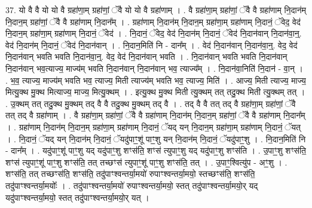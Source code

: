 \documentclass[17pt]{extarticle}
\begin{document}
37. यो वै वै यो यो वै ग्रहा॑णा॒म् ग्रहा॑णां॒ ॅवै यो यो वै ग्रहा॑णाम् । . वै ग्रहा॑णा॒म् ग्रहा॑णां॒ ॅवै वै ग्रहा॑णाम् नि॒दान॑म् नि॒दान॒म् ग्रहा॑णां॒ ॅवै वै ग्रहा॑णाम् नि॒दान᳚म् । . ग्रहा॑णाम् नि॒दान॑म् नि॒दान॒म् ग्रहा॑णा॒म् ग्रहा॑णाम् नि॒दानं॒ ॅवेद॒ वेद॑ नि॒दान॒म् ग्रहा॑णा॒म् ग्रहा॑णाम् नि॒दानं॒ ॅवेद॑ । . नि॒दानं॒ ॅवेद॒ वेद॑ नि॒दान॑म् नि॒दानं॒ ॅवेद॑ नि॒दान॑वान् नि॒दान॑वा॒न्॒. वेद॑ नि॒दान॑म् नि॒दानं॒ ॅवेद॑ नि॒दान॑वान् । . नि॒दान॒मिति॑ नि - दान᳚म् । . वेद॑ नि॒दान॑वान् नि॒दान॑वा॒न्॒. वेद॒ वेद॑ नि॒दान॑वान् भवति भवति नि॒दान॑वा॒न्॒. वेद॒ वेद॑ नि॒दान॑वान् भवति । . नि॒दान॑वान् भवति भवति नि॒दान॑वान् नि॒दान॑वान् भव॒त्याज्य॒ माज्य॑म् भवति नि॒दान॑वान् नि॒दान॑वान् भव॒ त्याज्य᳚म् । . नि॒दान॑वा॒निति॑ नि॒दान॑ - वा॒न् । . भ॒व॒ त्याज्य॒ माज्य॑म् भवति भव॒ त्याज्य॒ मिती त्याज्य॑म् भवति भव॒ त्याज्य॒ मिति॑ । . आज्य॒ मिती त्याज्य॒ माज्य॒ मित्यु॒क्थ मु॒क्थ मित्याज्य॒ माज्य॒ मित्यु॒क्थम् । . इत्यु॒क्थ मु॒क्थ मिती त्यु॒क्थम् तत् तदु॒क्थ मिती त्यु॒क्थम् तत् । . उ॒क्थम् तत् तदु॒क्थ मु॒क्थम् तद् वै वै तदु॒क्थ मु॒क्थम् तद् वै । . तद् वै वै तत् तद् वै ग्रहा॑णा॒म् ग्रहा॑णां॒ ॅवै तत् तद् वै ग्रहा॑णाम् । . वै ग्रहा॑णा॒म् ग्रहा॑णां॒ ॅवै वै ग्रहा॑णाम् नि॒दान॑म् नि॒दान॒म् ग्रहा॑णां॒ ॅवै वै ग्रहा॑णाम् नि॒दान᳚म् । . ग्रहा॑णाम् नि॒दान॑म् नि॒दान॒म् ग्रहा॑णा॒म् ग्रहा॑णाम् नि॒दानं॒ ॅयद् यन् नि॒दान॒म् ग्रहा॑णा॒म् ग्रहा॑णाम् नि॒दानं॒ ॅयत् । . नि॒दानं॒ ॅयद् यन् नि॒दान॑म् नि॒दानं॒ ॅयदु॑पाꣳ॒॒शू॑ पाꣳ॒॒शु यन् नि॒दान॑म् नि॒दानं॒ ॅयदु॑पाꣳ॒॒शु । . नि॒दान॒मिति॑ नि - दान᳚म् । . यदु॑पाꣳ॒॒शू॑ पाꣳ॒॒शु यद् यदु॑पाꣳ॒॒शु शꣳस॑ति॒ शꣳस॑ त्युपाꣳ॒॒शु यद् यदु॑पाꣳ॒॒शु शꣳस॑ति । . उ॒पाꣳ॒॒शु शꣳस॑ति॒ शꣳस॑ त्युपाꣳ॒॒शू॑ पाꣳ॒॒शु शꣳस॑ति॒ तत् तच्छꣳस॑ त्युपाꣳ॒॒शू॑ पाꣳ॒॒शु शꣳस॑ति॒ तत् । . उ॒पाꣳ॒॒श्वित्यु॑प - अꣳ॒॒शु । . शꣳस॑ति॒ तत् तच्छꣳस॑ति॒ शꣳस॑ति॒ तदु॑पाꣳश्वन्तर्या॒मयो॑ रुपाꣳश्वन्तर्या॒मयो॒ स्तच्छꣳस॑ति॒ शꣳस॑ति॒ तदु॑पाꣳश्वन्तर्या॒मयोः᳚ । . तदु॑पाꣳश्वन्तर्या॒मयो॑ रुपाꣳश्वन्तर्या॒मयो॒ स्तत् तदु॑पाꣳश्वन्तर्या॒मयो॒र् यद् यदु॑पाꣳश्वन्तर्या॒मयो॒ स्तत् तदु॑पाꣳश्वन्तर्या॒मयो॒र् यत् । \newline
\pagebreak
{}
\end{document}
